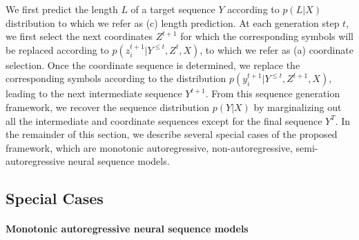 \documentclass{article}
\begin{document}
We first predict the length $L$ of a target sequence $Y$ according to $p(L | X)$ distribution to which we refer as (c) length prediction. At each generation step $t$, we first select the next coordinates $Z^{t+1}$ for which the corresponding symbols will be replaced according to $p(z^{t+1}_i | Y^{\leq t}, Z^{t}, X)$, to which we refer as (a) coordinate selection. Once the coordinate sequence is determined, we replace the corresponding symbols according to the distribution $p(y^{t+1}_i|Y^{\leq t}, Z^{t+1}, X)$, leading to the next intermediate sequence $Y^{t+1}$. From this sequence generation framework, we recover the sequence distribution $p(Y|X)$ by marginalizing out all the intermediate and coordinate sequences except for the final sequence $Y^T$. In the remainder of this section, we describe several special cases of the proposed framework, which are monotonic autoregressive, non-autoregressive, semi-autoregressive neural sequence models.%

\subsection{Special Cases}

\paragraph{Monotonic autoregressive neural sequence models}
\end{document}
